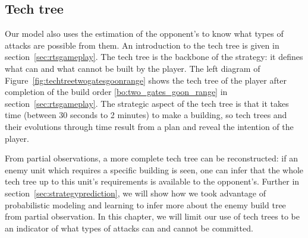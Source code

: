 \subsection{Tech tree}
\label{sec:techtree}
Our model also uses the estimation of the opponent's  to know what types of attacks are possible from them. An introduction to the tech tree is given in section~\ref{sec:rtsgameplay}. The tech tree is the backbone of the strategy: it defines what can and what cannot be built by the player. The left diagram of Figure~\ref{fig:techtreetwogatesgoonrange} shows the tech tree of the player after completion of the build order \ref{bo:two_gates_goon_range} in section~\ref{sec:rtsgameplay}. The strategic aspect of the tech tree is that it takes time (between 30 seconds to 2 minutes) to make a building, so tech trees and their evolutions through time result from a plan and reveal the intention of the player. 

From partial observations, a more complete tech tree can be reconstructed: if an enemy unit which requires a specific building is seen, one can infer that the whole tech tree up to this unit's requirements is available to the opponent's. Further in section~\ref{sec:strategyprediction}, we will show how we took advantage of probabilistic modeling and learning to infer more about the enemy build tree from partial observation. In this chapter, we will limit our use of tech trees to be an indicator of what types of attacks can and cannot be committed.

